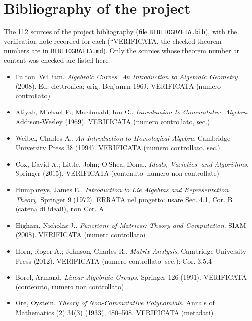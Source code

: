 \documentclass[11pt]{article}
\theoremstyle{plain}
\theoremstyle{definition}
\theoremstyle{remark}
\begin{document}



\section{Bibliography of the project}\label{f:app:biblio}
The 112 sources of the project bibliography (file \texttt{BIBLIOGRAFIA.bib}), with the verification note recorded for each (``VERIFICATA, the checked theorem numbers are in \texttt{BIBLIOGRAFIA.md}). Only the sources whose theorem number or content was checked are listed here.
\begin{itemize}[itemsep=2pt,leftmargin=1.2em,font=\small]
\item Fulton, William. \emph{Algebraic Curves. An Introduction to Algebraic Geometry} (2008). \textsf{\footnotesize Ed. elettronica; orig. Benjamin 1969. VERIFICATA (numero controllato)}
\item Atiyah, Michael F.; Macdonald, Ian G.. \emph{Introduction to Commutative Algebra}. Addison-Wesley (1969). \textsf{\footnotesize VERIFICATA (numero controllato, sec.)}
\item Weibel, Charles A.. \emph{An Introduction to Homological Algebra}. Cambridge University Press 38 (1994). \textsf{\footnotesize VERIFICATA (numero controllato, sec.)}
\item Cox, David A.; Little, John; O'Shea, Donal. \emph{Ideals, Varieties, and Algorithms}. Springer (2015). \textsf{\footnotesize VERIFICATA (contenuto, numero non controllato)}
\item Humphreys, James E.. \emph{Introduction to Lie Algebras and Representation Theory}. Springer 9 (1972). \textsf{\footnotesize ERRATA nel progetto: usare Sec. 4.1, Cor. B (catena di ideali), non Cor. A}
\item Higham, Nicholas J.. \emph{Functions of Matrices: Theory and Computation}. SIAM (2008). \textsf{\footnotesize VERIFICATA (numero controllato)}
\item Horn, Roger A.; Johnson, Charles R.. \emph{Matrix Analysis}. Cambridge University Press (2012). \textsf{\footnotesize VERIFICATA (numero controllato, sec.): Cor. 3.5.4}
\item Borel, Armand. \emph{Linear Algebraic Groups}. Springer 126 (1991). \textsf{\footnotesize VERIFICATA (contenuto, numero non controllato)}
\item Ore, Oystein. \emph{Theory of Non-Commutative Polynomials}. Annals of Mathematics (2) 34(3) (1933), 480--508. \textsf{\footnotesize VERIFICATA (metadati)}

\end{itemize}
\end{document}
